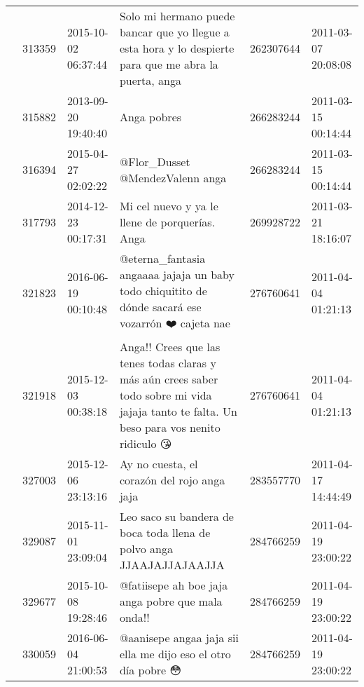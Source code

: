 \begin{tabular}{llllrl}
           & 313359  & 2015-10-02 06:37:44 &                                       Solo mi hermano puede bancar que yo llegue a esta hora y lo despierte para que me abra la puerta, anga &   262307644 & 2011-03-07 20:08:08 \\
           & 315882  & 2013-09-20 19:40:40 &                                                                                                                                  Anga pobres &   266283244 & 2011-03-15 00:14:44 \\
           & 316394  & 2015-04-27 02:02:22 &                                                                                                              @Flor\_Dusset @MendezValenn anga &   266283244 & 2011-03-15 00:14:44 \\
           & 317793  & 2014-12-23 00:17:31 &                                                                                               Mi cel nuevo y ya le llene de porquerías. Anga &   269928722 & 2011-03-21 18:16:07 \\
           & 321823  & 2016-06-19 00:10:48 &                                           @eterna\_fantasia angaaaa jajaja un baby todo chiquitito de dónde sacará ese vozarrón ❤️ cajeta nae &   276760641 & 2011-04-04 01:21:13 \\
           & 321918  & 2015-12-03 00:38:18 &   Anga!! Crees que las tenes todas claras y más aún crees saber todo sobre mi vida jajaja tanto te falta. Un beso para vos nenito ridiculo 😘 &   276760641 & 2011-04-04 01:21:13 \\
           & 327003  & 2015-12-06 23:13:16 &                                                                                                  Ay no cuesta, el corazón del rojo anga jaja &   283557770 & 2011-04-17 14:44:49 \\
           & 329087  & 2015-11-01 23:09:04 &                                                                         Leo saco su bandera de boca toda llena de polvo anga JJAAJAJJAJAAJJA &   284766259 & 2011-04-19 23:00:22 \\
           & 329677  & 2015-10-08 19:28:46 &                                                                                            @fatiisepe ah boe jaja anga pobre que mala onda!! &   284766259 & 2011-04-19 23:00:22 \\
           & 330059  & 2016-06-04 21:00:53 &                                                                                @aanisepe angaa jaja sii ella me dijo eso el otro día pobre 😳 &   284766259 & 2011-04-19 23:00:22 \\

\end{tabular}
